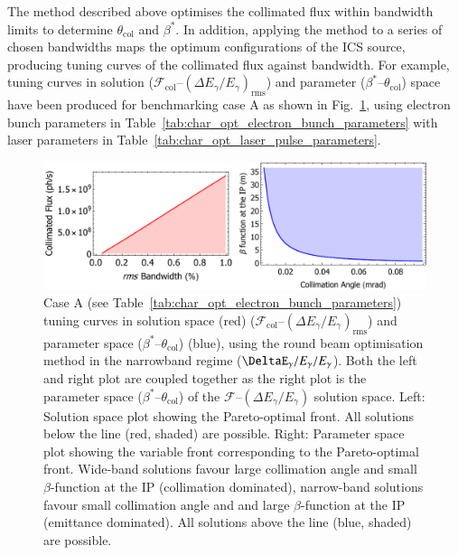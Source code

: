 \documentclass[../main.tex]{subfiles}
\begin{document}
The method described above optimises the collimated flux within bandwidth limits to determine $\theta_{\mathrm{col}}$ and $\beta^{*}$. In addition, applying the method to a series of chosen bandwidths maps the optimum configurations of the ICS source, producing tuning curves of the collimated flux against bandwidth. For example, tuning curves in solution ($\mathcal{F}_{\mathrm{col}}$--$\left(\Delta E_{\gamma}/E_{\gamma}\right)_{\mathrm{rms}}$) and parameter ($\beta^{*}$--$\theta_{\mathrm{col}}$) space have been produced for benchmarking case A as shown in Fig.~\ref{fig:CaseA_RB_tuning_curve}, using electron bunch parameters in Table~\ref{tab:char_opt_electron_bunch_parameters} with laser parameters in Table~\ref{tab:char_opt_laser_pulse_parameters}. 
\begin{figure}[!h]
\centering
\includegraphics[width=\textwidth]{Figures/Optimisation_and_Characterisation_of_Inverse_Compton_Scattering_Sources/Case_A_RB_Tuning_Curves.pdf}
\caption{Case A (see Table~\ref{tab:char_opt_electron_bunch_parameters}) tuning curves in solution space (red) ($\mathcal{F}_{\mathrm{col}}$--$\left(\Delta E_{\gamma}/E_{\gamma}\right)_{\mathrm{rms}}$) and parameter space ($\beta^{*}$--$\theta_{\mathrm{col}}$) (blue), using the round beam optimisation method in the narrowband regime ($\DeltaE_{\gamma}/E_{\gamma}/E_{\gamma}$). Both the left and right plot are coupled together as the right plot is the parameter space ($\beta^{*}$--$\theta_{\mathrm{col}}$) of the $\mathcal{F}$--$\left(\Delta E_{\gamma}/E_{\gamma}\right)$ solution space. Left: Solution space plot showing the Pareto-optimal front. All solutions below the line (red, shaded) are possible. Right: Parameter space plot showing the variable front corresponding to the Pareto-optimal front. Wide-band solutions favour large collimation angle and small $\beta$-function at the IP (collimation dominated), narrow-band solutions favour small collimation angle and and large $\beta$-function at the IP (emittance dominated). All solutions above the line (blue, shaded) are possible. }
\label{fig:CaseA_RB_tuning_curve}
\end{figure}
\end{document}
